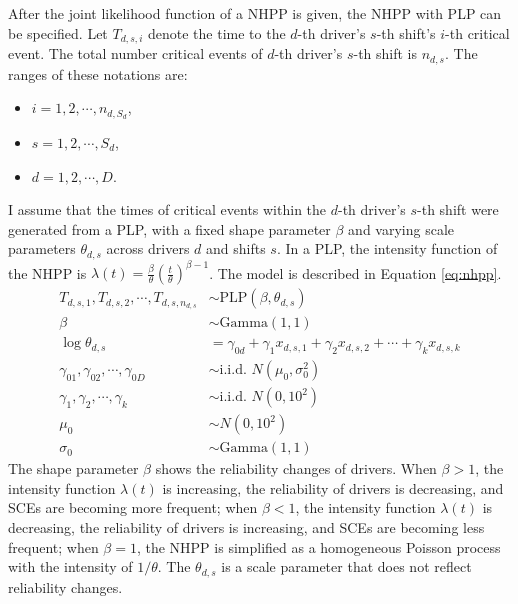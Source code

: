 \documentclass[12pt]{book}
\numberwithin{equation}{chapter}
\providecommand{\tightlist}{%
  \setlength{\itemsep}{0pt}\setlength{\parskip}{0pt}}
\begin{document}
After the joint likelihood function of a NHPP is given, the NHPP with PLP can be specified. Let \(T_{d, s, i}\) denote the time to the \(d\)-th driver's \(s\)-th shift's \(i\)-th critical event. The total number critical events of \(d\)-th driver's \(s\)-th shift is \(n_{d,s}\). The ranges of these notations are:

\begin{itemize}
\tightlist
\item
  \(i = 1, 2, \cdots, n_{d, S_d}\),
\item
  \(s = 1, 2, \cdots, S_d\),
\item
  \(d = 1, 2, \cdots, D\).
\end{itemize}

I assume that the times of critical events within the \(d\)-th driver's \(s\)-th shift were generated from a PLP, with a fixed shape parameter \(\beta\) and varying scale parameters \(\theta_{d, s}\) across drivers \(d\) and shifts \(s\). In a PLP, the intensity function of the NHPP is \(\lambda(t) = \frac{\beta}{\theta}(\frac{t}{\theta})^{\beta-1}\). The model is described in Equation \eqref{eq:nhpp}.
\begin{equation}
\begin{aligned}
  T_{d, s, 1}, T_{d, s, 2}, \cdots , T_{d, s, n_{d, s}} & \sim \text{PLP}(\beta, \theta_{d, s})\\
  \beta & \sim \text{Gamma}(1, 1)\\
  \log\theta_{d, s} &= \gamma_{0d} + \gamma_{1}x_{d, s, 1} + \gamma_{2}x_{d, s, 2} + \cdots + \gamma_{k}x_{d, s, k}\\
  \gamma_{01}, \gamma_{02}, \cdots, \gamma_{0D} & \sim \text{i.i.d. }N(\mu_0, \sigma_0^2)\\
  \gamma_1, \gamma_2, \cdots, \gamma_k & \sim \text{i.i.d. }N(0, 10^2)\\
  \mu_0 &\sim N(0, 10^2) \\
  \sigma_0 &\sim \text{Gamma}(1, 1)
\label{eq:nhpp}
\end{aligned}
\end{equation}
The shape parameter \(\beta\) shows the reliability changes of drivers. When \(\beta > 1\), the intensity function \(\lambda(t)\) is increasing, the reliability of drivers is decreasing, and SCEs are becoming more frequent; when \(\beta < 1\), the intensity function \(\lambda(t)\) is decreasing, the reliability of drivers is increasing, and SCEs are becoming less frequent; when \(\beta = 1\), the NHPP is simplified as a homogeneous Poisson process with the intensity of \(1/\theta\). The \(\theta_{d, s}\) is a scale parameter that does not reflect reliability changes.
\end{document}
